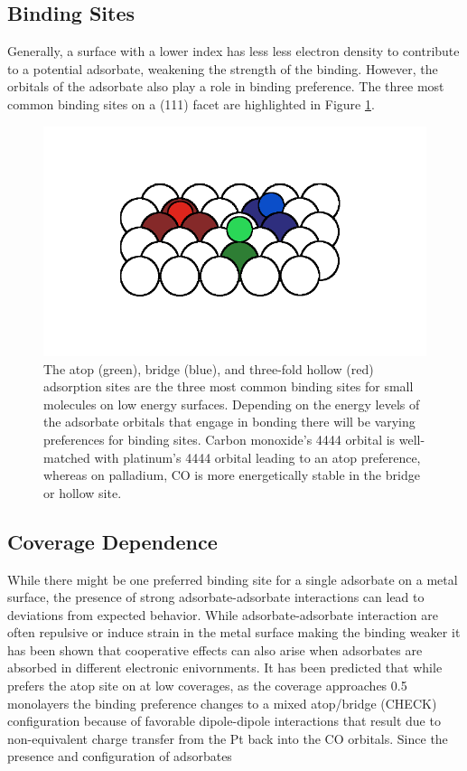 \subsection{Binding Sites}
Generally, a surface with a lower index has less less electron density to
contribute to a potential adsorbate, weakening the strength of the binding.
However, the orbitals of the adsorbate also play a role in binding preference.
The three most common binding sites on a (111) facet are highlighted in Figure
\ref{fig:binding}.
\begin{figure}
  \includegraphics[width=\linewidth]{../figures/chap1/binding.pdf}
  \caption{The atop (green), bridge (blue), and three-fold hollow (red)
adsorption sites are the three most common binding sites for small molecules on
low energy surfaces. Depending on the energy levels of the adsorbate orbitals
that engage in bonding there will be varying preferences for binding sites.
Carbon monoxide's 4444 orbital is well-matched with platinum's 4444 orbital
leading to an atop preference, whereas on palladium, CO is more energetically
stable in the bridge or hollow site.}
\label{fig:binding}
\end{figure}


\subsection{Coverage Dependence}
While there might be one preferred binding site for a single adsorbate on a
metal surface, the presence of strong adsorbate-adsorbate interactions can lead
to deviations from expected behavior. While adsorbate-adsorbate interaction are
often repulsive or induce strain in the metal surface making the binding
weaker\citep{Deshlahra:2012aa} it has been shown that cooperative effects can also arise when
adsorbates are absorbed in different electronic enivornments. It has been
predicted that while  prefers the atop site on  at low coverages,
as the coverage approaches 0.5 monolayers the binding preference changes to a
mixed atop/bridge (CHECK) configuration because of favorable dipole-dipole
interactions that result due to non-equivalent charge transfer from the Pt back
into the CO orbitals. Since the presence and configuration of adsorbates 


